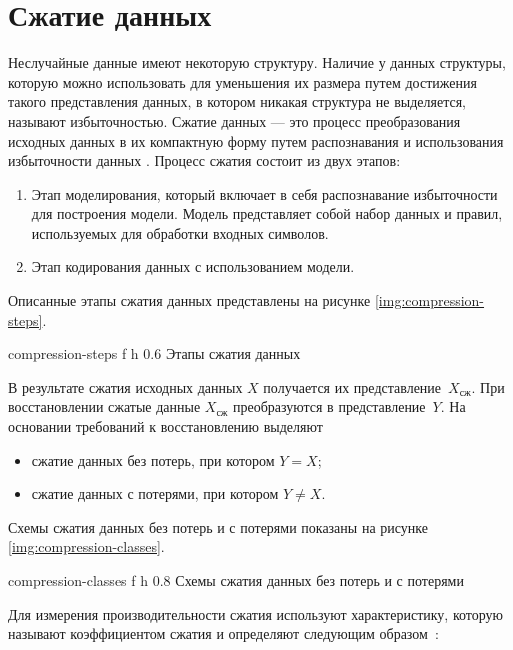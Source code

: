 \section{Сжатие данных}

Неслучайные данные имеют некоторую структуру. Наличие у данных структуры, которую можно использовать для уменьшения их размера путем достижения такого представления данных, в котором никакая структура не выделяется, называют избыточностью. Сжатие данных --- это процесс преобразования исходных данных в их компактную форму путем распознавания и использования избыточности данных \cite{compression-definition}. Процесс сжатия состоит из двух этапов:

\begin{enumerate}
	\item Этап моделирования, который включает в себя распознавание избыточности для построения модели. Модель представляет собой набор данных и правил, используемых для обработки входных символов.
	\item Этап кодирования данных с использованием модели.
\end{enumerate}

Описанные этапы сжатия данных представлены на рисунке \ref{img:compression-steps}.

    {compression-steps}
    {f}
    {h}
    {0.6\textwidth}
    {Этапы сжатия данных}

В результате сжатия исходных данных $X$ получается их представление~$X_{\text{сж}}$. При восстановлении сжатые данные $X_{\text{сж}}$ преобразуются в представление~$Y$. На основании требований к восстановлению выделяют \cite{compression-classes}

\begin{itemize}
	\item сжатие данных без потерь, при котором $Y = X$;
	\item сжатие данных с потерями, при котором $Y \not= X$.
\end{itemize}

Схемы сжатия данных без потерь и с потерями показаны на рисунке \ref{img:compression-classes}.

    {compression-classes}
    {f}
    {h}
    {0.8\textwidth}
    {Схемы сжатия данных без потерь и с потерями}

Для измерения производительности сжатия используют характеристику, которую называют коэффициентом сжатия и определяют следующим образом~\cite{compression-coefficient}:


